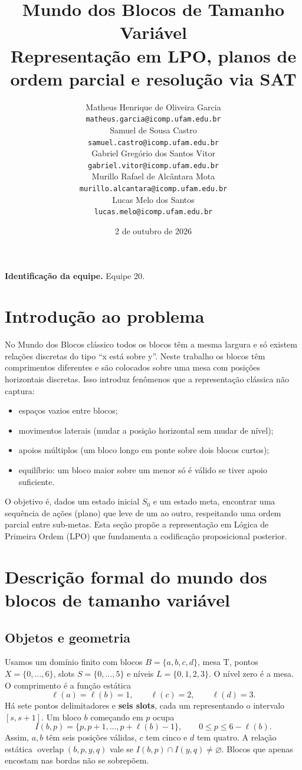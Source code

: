 \documentclass[11pt,a4paper]{article}
\title{\textbf{Mundo dos Blocos de Tamanho Variável}\\[5pt]\large Representação em LPO, planos de ordem parcial e resolução via SAT}
\author{\small Matheus Henrique de Oliveira Garcia\\[-1pt]\small\texttt{matheus.garcia@icomp.ufam.edu.br}\\[4pt]\small Samuel de Sousa Castro\\[-1pt]\small\texttt{samuel.castro@icomp.ufam.edu.br}\\[4pt]\small Gabriel Gregório dos Santos Vitor\\[-1pt]\small\texttt{gabriel.vitor@icomp.ufam.edu.br}\\[4pt]\small Murillo Rafael de Alcântara Mota\\[-1pt]\small\texttt{murillo.alcantara@icomp.ufam.edu.br}\\[4pt]\small Lucas Melo dos Santos\\[-1pt]\small\texttt{lucas.melo@icomp.ufam.edu.br}}
\date{2 de outubro de 2026}
\newcommand{\Ov}{\operatorname{overlap}}
\newcommand{\T}{\mathrm{T}}
\begin{document}
\maketitle
\thispagestyle{empty}
\textbf{Identificação da equipe.} Equipe 20.

\newpage
\section{Introdução ao problema}
No Mundo dos Blocos clássico todos os blocos têm a mesma largura e só existem relações discretas do tipo ``x está sobre y''. Neste trabalho os blocos têm comprimentos diferentes e são colocados sobre uma mesa com posições horizontais discretas. Isso introduz fenômenos que a representação clássica não captura:
\begin{itemize}
\item espaços vazios entre blocos;
\item movimentos laterais (mudar a posição horizontal sem mudar de nível);
\item apoios múltiplos (um bloco longo em ponte sobre dois blocos curtos);
\item equilíbrio: um bloco maior sobre um menor só é válido se tiver apoio suficiente.
\end{itemize}
O objetivo é, dados um estado inicial $S_0$ e um estado meta, encontrar uma sequência de ações (plano) que leve de um ao outro, respeitando uma ordem parcial entre sub-metas. Esta seção propõe a representação em Lógica de Primeira Ordem (LPO) que fundamenta a codificação proposicional posterior.

\section{Descrição formal do mundo dos blocos de tamanho variável}
\subsection{Objetos e geometria}
Usamos um domínio finito com blocos $B=\{a,b,c,d\}$, mesa $\T$, pontos $X=\{0,\ldots,6\}$, slots $S=\{0,\ldots,5\}$ e níveis $L=\{0,1,2,3\}$. O nível zero é a mesa. O comprimento é a função estática
\[
\ell(a)=\ell(b)=1,\qquad \ell(c)=2,\qquad \ell(d)=3.
\]
Há sete pontos delimitadores e \textbf{seis slots}, cada um representando o intervalo $[s,s+1]$. Um bloco $b$ começando em $p$ ocupa
\[
I(b,p)=\{p,p+1,\ldots,p+\ell(b)-1\},\qquad 0\leq p\leq6-\ell(b).
\]
Assim, $a,b$ têm seis posições válidas, $c$ tem cinco e $d$ tem quatro. A relação estática $\Ov(b,p,y,q)$ vale se $I(b,p)\cap I(y,q)\neq\varnothing$. Blocos que apenas encostam nas bordas não se sobrepõem.
\end{document}
